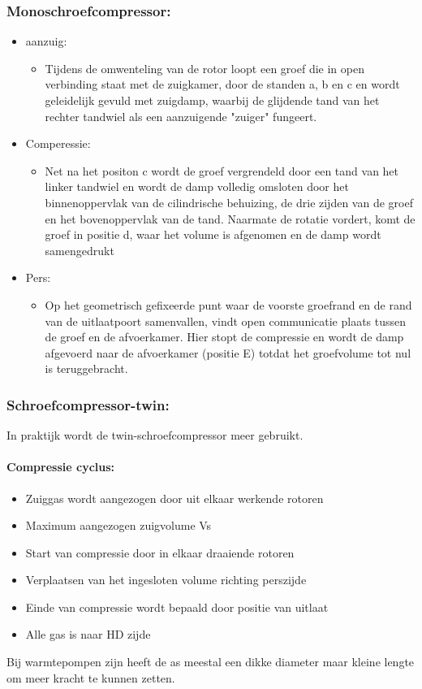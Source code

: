 \documentclass[12pt]{article}
\begin{document}
\subsubsection{Monoschroefcompressor:}
\begin{itemize}
    \item aanzuig:\begin{itemize}
        \item Tijdens de omwenteling van de rotor loopt een groef die in open
        verbinding staat met de zuigkamer, door de standen a, b en c en
        wordt geleidelijk gevuld met zuigdamp, waarbij de glijdende tand
        van het rechter tandwiel als een aanzuigende "zuiger" fungeert.
    \end{itemize}
    \item Comperessie:\begin{itemize}
        \item Net na het positon c wordt de groef vergrendeld door een tand
        van het linker tandwiel en wordt de damp volledig omsloten
        door het binnenoppervlak van de cilindrische behuizing, de drie
        zijden van de groef en het bovenoppervlak van de tand.
        Naarmate de rotatie vordert, komt de groef in positie d, waar het
        volume is afgenomen en de damp wordt samengedrukt
    \end{itemize}
    \item Pers:\begin{itemize}
        \item Op het geometrisch gefixeerde punt waar de voorste groefrand
        en de rand van de uitlaatpoort samenvallen, vindt open
        communicatie plaats tussen de groef en de afvoerkamer. Hier
        stopt de compressie en wordt de damp afgevoerd naar de
        afvoerkamer (positie E) totdat het groefvolume tot nul is
        teruggebracht.        
    \end{itemize}
\end{itemize}
\subsubsection{Schroefcompressor-twin:}
In praktijk wordt de twin-schroefcompressor meer gebruikt.
\paragraph{Compressie cyclus:}\begin{itemize}
    \item Zuiggas wordt aangezogen door uit elkaar werkende rotoren
    \item Maximum aangezogen zuigvolume Vs
    \item Start van compressie door in elkaar draaiende rotoren
    \item Verplaatsen van het ingesloten volume richting perszijde
    \item Einde van compressie wordt bepaald door positie van uitlaat
    \item Alle gas is naar HD zijde
\end{itemize}
Bij warmtepompen zijn heeft de as meestal een dikke diameter maar kleine lengte om meer kracht te kunnen zetten.
\end{document}
